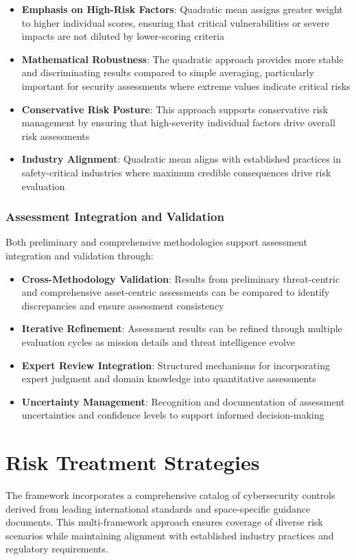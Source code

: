 \documentclass[binding=0.6cm]{sapthesis}
\begin{document}
\begin{itemize}
    \item \textbf{Emphasis on High-Risk Factors}: Quadratic mean assigns greater weight to higher individual scores, ensuring that critical vulnerabilities or severe impacts are not diluted by lower-scoring criteria
    \item \textbf{Mathematical Robustness}: The quadratic approach provides more stable and discriminating results compared to simple averaging, particularly important for security assessments where extreme values indicate critical risks
    \item \textbf{Conservative Risk Posture}: This approach supports conservative risk management by ensuring that high-severity individual factors drive overall risk assessments
    \item \textbf{Industry Alignment}: Quadratic mean aligns with established practices in safety-critical industries where maximum credible consequences drive risk evaluation
\end{itemize}

\subsubsection{Assessment Integration and Validation}

Both preliminary and comprehensive methodologies support assessment integration and validation through:

\begin{itemize}
    \item \textbf{Cross-Methodology Validation}: Results from preliminary threat-centric and comprehensive asset-centric assessments can be compared to identify discrepancies and ensure assessment consistency
    \item \textbf{Iterative Refinement}: Assessment results can be refined through multiple evaluation cycles as mission details and threat intelligence evolve
    \item \textbf{Expert Review Integration}: Structured mechanisms for incorporating expert judgment and domain knowledge into quantitative assessments
    \item \textbf{Uncertainty Management}: Recognition and documentation of assessment uncertainties and confidence levels to support informed decision-making

\end{itemize}

\section{Risk Treatment Strategies}
The framework incorporates a comprehensive catalog of cybersecurity controls derived from leading international standards and space-specific guidance documents. This multi-framework approach ensures coverage of diverse risk scenarios while maintaining alignment with established industry practices and regulatory requirements.
\end{document}
